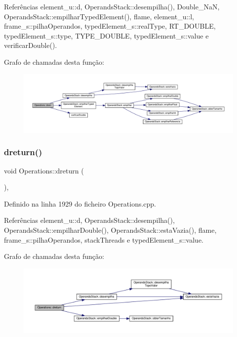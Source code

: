 Referências element\+\_\+u\+::d, Operands\+Stack\+::desempilha(), Double\+\_\+\+NaN, Operands\+Stack\+::empilhar\+Typed\+Element(), flame, element\+\_\+u\+::l, frame\+\_\+s\+::pilha\+Operandos, typed\+Element\+\_\+s\+::real\+Type, R\+T\+\_\+\+D\+O\+U\+B\+LE, typed\+Element\+\_\+s\+::type, T\+Y\+P\+E\+\_\+\+D\+O\+U\+B\+LE, typed\+Element\+\_\+s\+::value e verificar\+Double().

Grafo de chamadas desta função\+:
\nopagebreak
\begin{figure}[H]
\begin{center}
\leavevmode
\includegraphics[width=350pt]{classOperations_abe333415749dbd2331ce89dc5e2233c5_cgraph}
\end{center}
\end{figure}
\mbox{\label{classOperations_a85ce8267820ffcc1e1530d533545c9f3}} 
\subsubsection{\texorpdfstring{dreturn()}{dreturn()}}
{\footnotesize\ttfamily void Operations\+::dreturn (\begin{DoxyParamCaption}{ }\end{DoxyParamCaption})\hspace{0.3cm}{\ttfamily [static]}, {\ttfamily [private]}}



Definido na linha 1929 do ficheiro Operations.\+cpp.



Referências element\+\_\+u\+::d, Operands\+Stack\+::desempilha(), Operands\+Stack\+::empilhar\+Double(), Operands\+Stack\+::esta\+Vazia(), flame, frame\+\_\+s\+::pilha\+Operandos, stack\+Threads e typed\+Element\+\_\+s\+::value.

Grafo de chamadas desta função\+:
\nopagebreak
\begin{figure}[H]
\begin{center}
\leavevmode
\includegraphics[width=350pt]{classOperations_a85ce8267820ffcc1e1530d533545c9f3_cgraph}
\end{center}
\end{figure}
\mbox{\label{classOperations_a83fb57afed30b1223f8485492f9d9958}} 
